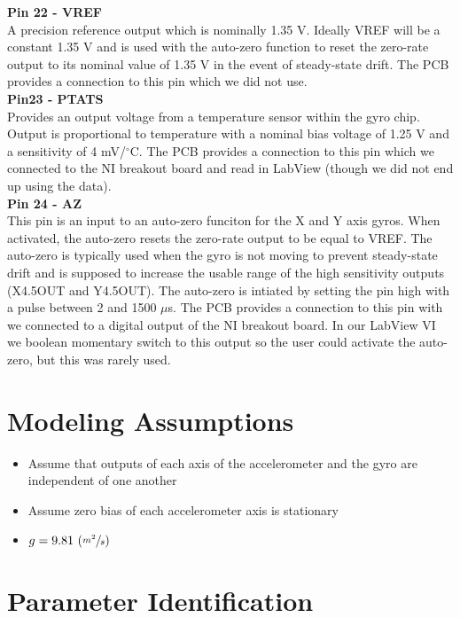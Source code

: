 \documentclass{article}
\theoremstyle{plain}
\theoremstyle{definition}
\theoremstyle{remark}
\begin{document}
\textbf{Pin 22 - VREF}\\
A precision reference output which is nominally 1.35 V. Ideally VREF will be a constant 1.35 V and is used with the auto-zero function to reset the zero-rate output to its nominal value of 1.35 V in the event of steady-state drift. The PCB provides a connection to this pin which we did not use.\\

\textbf{Pin23 - PTATS}\\
Provides an output voltage from a temperature sensor within the gyro chip. Output is proportional to temperature with a nominal bias voltage of 1.25 V and a sensitivity of 4 mV/$^{\circ}$C. The PCB provides a connection to this pin which we connected to the NI breakout board and read in LabView (though we did not end up using the data).\\

\textbf{Pin 24 - AZ}\\
This pin is an input to an auto-zero funciton for the X and Y axis gyros. When activated, the auto-zero resets the zero-rate output to be equal to VREF. The auto-zero is typically used when the gyro is not moving to prevent steady-state drift and is supposed to increase the usable range of the high sensitivity outputs (X4.5OUT and Y4.5OUT). The auto-zero is intiated by setting the pin high with a pulse between 2 and 1500 $\mu$s. The PCB provides a connection to this pin with we connected to a digital output of the NI breakout board. In our LabView VI we boolean momentary switch to this output so the user could activate the auto-zero, but this was rarely used.\\ 

\section{Modeling Assumptions}
\begin{itemize}
\item{Assume that outputs of each axis of the accelerometer and the gyro are independent of one another}
\item{Assume zero bias of each accelerometer axis is stationary} %
\item{$g = 9.81 \, \left( \sfrac{m^2}{s}\right) $}
\end{itemize}

\section{Parameter Identification}
\end{document}
